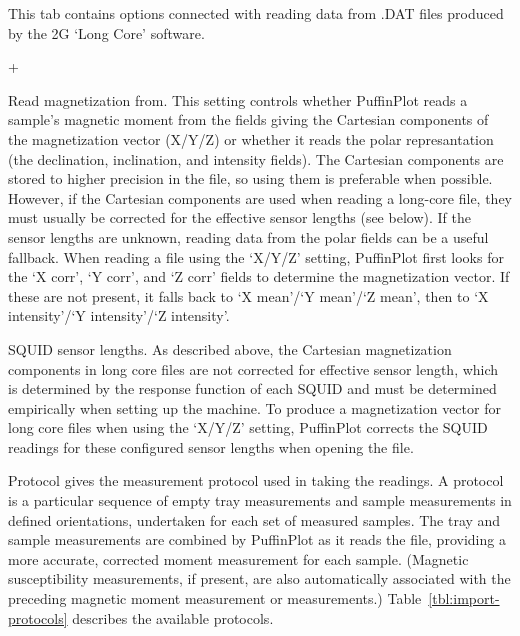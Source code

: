 \documentclass[a4paper,british]{article}
\newcommand{\menuitemlabel}[1]{%
\mbox{\textsf{#1}}\hfil}
\newenvironment{menuitemlist}%
{\begin{list}{}{%
\renewcommand{\makelabel}{\menuitemlabel}%
\setlength{\labelwidth}{35pt}%
\setlength{\leftmargin}%
             {\labelwidth+\labelsep}}}%
{\end{list}}
\newcommand{\caps}[1]{\MakeTextUppercase{#1}} %
\begin{document}
This tab contains options connected with reading data from \caps{.dat} files
produced by the \caps{2g} `Long Core' software.

\begin{menuitemlist}

\item[Read magnetization from.] This setting controls whether PuffinPlot
  reads a sample's magnetic moment from the fields giving the Cartesian
  components of the magnetization vector (X/Y/Z) or whether it reads the
  polar represantation (the declination, inclination, and intensity fields).
  The Cartesian components are stored to higher precision in the file, so
  using them is preferable when possible. However, if the Cartesian
  components are used when reading a long-core file, they must usually be
  corrected for the effective sensor lengths (see below). If the sensor
  lengths are unknown, reading data from the polar fields can be a useful
  fallback. When reading a file using the `X/Y/Z' setting, PuffinPlot first
  looks for the `X corr', `Y corr', and `Z corr' fields to determine the
  magnetization vector. If these are not present, it falls back to `X
  mean'/`Y mean'/`Z mean', then to `X intensity'/`Y intensity'/`Z intensity'.

\item[\caps{Squid} sensor lengths.] As described above, the Cartesian
  magnetization components in long core files are not corrected for effective
  sensor length, which is determined by the response function of each
  \caps{squid} and must be determined empirically when setting up the
  machine. To produce a magnetization vector for long core files when using
  the ‘X/Y/Z’ setting, PuffinPlot corrects the \caps{squid} readings for
  these configured sensor lengths when opening the file.

\item[Protocol] gives the measurement protocol used in taking the readings. A
  protocol is a particular sequence of empty tray measurements and sample
  measurements in defined orientations, undertaken for each set of measured
  samples. The tray and sample measurements are combined by PuffinPlot as it
  reads the file, providing a more accurate, corrected moment measurement for
  each sample. (Magnetic susceptibility measurements, if present, are also
  automatically associated with the preceding magnetic moment measurement or
  measurements.) Table~\ref{tbl:import-protocols} describes the
  available protocols.

\end{menuitemlist}
\end{document}

